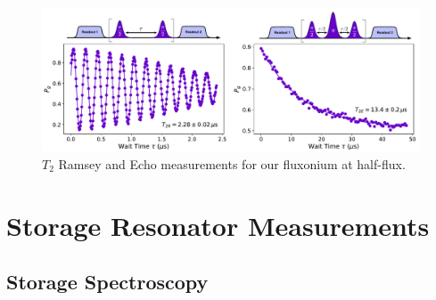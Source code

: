 
\begin{figure}[h]
    \centering
    \includegraphics[width=0.95\linewidth]{Figures/4/T2_ramsey_echo.pdf}
    \caption{$T_2$ Ramsey and Echo measurements for our fluxonium at half-flux.}
    \label{fig:4_T2_ramsey_echo}
\end{figure}

\clearpage
\section{Storage Resonator Measurements \label{sec:4_StorageChi}}

\subsection{Storage Spectroscopy}

